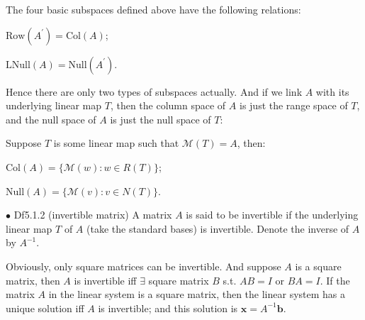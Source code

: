 \documentclass{article}
\begin{document}
\begin{Rmk}{}
    The four basic subspaces defined above have the following relations:
    \textcolor{Th}{
    \begin{compactenum}
        \item $\text{Row}(A^\prime) = \text{Col}(A)$;
        \item $\text{LNull}(A) = \text{Null}(A^\prime)$.
    \end{compactenum}
    }
    Hence there are only two types of subspaces actually. And if we link $A$ with its underlying linear map $T$, then the column space of $A$ is just the range space of $T$, and the null space of $A$ is just the null space of $T$: \textcolor{Th}{Suppose $T$ is some linear map such that $\mathcal{M}(T) = A$, then:
    \begin{compactenum}
        \item $\text{Col}(A) = \{\mathcal{M}(w): w\in R(T)\}$;
        \item $\text{Null}(A) = \{\mathcal{M}(v): v\in N(T)\}$.
    \end{compactenum}
    }
\end{Rmk}

\begin{Df}{$\bullet$ Df5.1.2 (invertible matrix)}
    A matrix $A$ is said to be invertible if the underlying linear map $T$ of $A$ (take the standard bases) is invertible. Denote the inverse of $A$ by $A^{-1}$.
\end{Df}

\begin{Rmk}{}
    Obviously, \textcolor{Th}{only square matrices can be invertible}. And \textcolor{Th}{suppose $A$ is a square matrix, then $A$ is invertible iff $\exists$ square matrix $B$ s.t. $AB = I$ or $BA = I$}. \textcolor{Th}{If the matrix $A$ in the linear system is a square matrix, then the linear system has a unique solution iff $A$ is invertible; and this solution is $\pmb{x} = A^{-1}\pmb{b}$.}
\end{Rmk}
\end{document}
